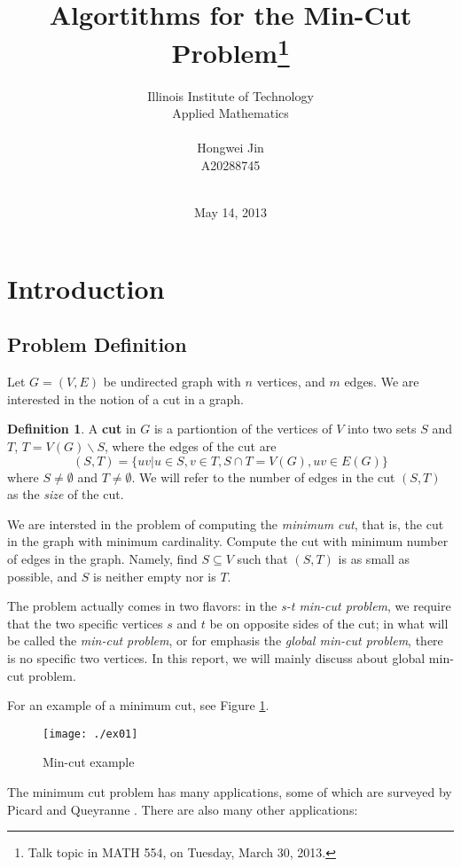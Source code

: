 \documentclass[11pt]{article}
\title{\textbf{Algortithms for the Min-Cut Problem\footnote{Talk topic in MATH 554, on Tuesday, March 30, 2013. }}}
\author{Illinois Institute of Technology\\ Applied Mathematics\\ \\Hongwei Jin\\ A20288745\\ \\}
\date{May 14, 2013}
\theoremstyle{plain}
\theoremstyle{definition}
\newtheorem{defn}[thm]{Definition}
\theoremstyle{remark}
\begin{document}
\maketitle
\thispagestyle{empty}
\newpage

\section{Introduction}
\subsection{Problem Definition}

Let $ G = (V,E) $ be undirected graph with $ n $ vertices, and $ m $ edges. We are interested in the notion of a cut in a graph.

\begin{defn}
A \textbf{cut} in $ G $ is a partiontion of the vertices of $ V $ into two sets $ S $ and $ T $, $ T=V(G)\backslash S $, where the edges of the cut are \[ (S,T)=\{ uv|u\in S, v \in T,S\cap T=V(G), uv\in E(G) \} \]
where $ S \neq \emptyset $ and $  T \neq \emptyset $. We will refer to the number of edges in the cut $ (S,T) $ as the \textit{size} of the cut.
\end{defn}

We are intersted in the problem of computing the \textit{minimum cut}, that is, the cut in the graph with minimum cardinality. Compute the cut with minimum number of edges in the graph. Namely, find $ S\subseteq V $ such that $ (S, T) $ is as small as possible, and $ S $ is neither empty nor is $ T  $.

The problem actually comes in two flavors: in the \textit{ s-t  min-cut problem}, we require that the two specific vertices $ s $ and $ t $ be on opposite sides of the cut; in what will be called the \textit{min-cut problem}, or for emphasis the \textit{global min-cut problem}, there is no specific two vertices. In this report, we will mainly discuss about global min-cut problem.

For an example of a minimum cut, see Figure \ref{fig:ex01}. 

\begin{figure}[h]
\centering
\texttt{[image: ./ex01]}
\caption{Min-cut example}
\label{fig:ex01}
\end{figure}

The minimum cut problem has many applications, some of which are surveyed by Picard and Queyranne \cite{picard1982structure}. There are also many other applications:
\end{document}
